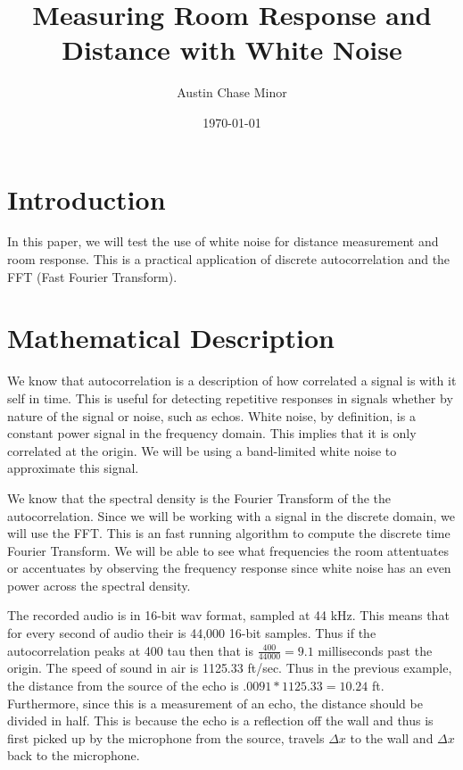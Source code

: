 \documentclass{article}
\author{Austin Chase Minor}
\title{Measuring Room Response and Distance with White Noise}
\date{\today}
\begin{document}
   \section{Introduction}
      In this paper, we will test the use of
      white noise for distance measurement and
      room response. This is a practical application
      of discrete autocorrelation and the FFT
      (Fast Fourier Transform).
   \section{Mathematical Description}
      We know that autocorrelation is a description of
      how correlated a signal is with it self in time.
      This is useful for detecting repetitive responses
      in signals whether by nature of the signal or noise,
      such as echos. White noise, by definition, is a constant
      power signal in the frequency domain. This implies that it
      is only correlated at the origin. We will be using a band-limited
      white noise to approximate this signal.

      We know that the spectral density is the Fourier Transform of the
      the autocorrelation. Since we will be working with a signal in the
      discrete domain, we will use the FFT. This is an fast running
      algorithm to compute the discrete time Fourier Transform. We will
      be able to see what frequencies the room attentuates or accentuates
      by observing the frequency response since white noise has an
      even power across the spectral density.

      The recorded audio is in 16-bit wav format, sampled at 44 kHz.
      This means that for every second of audio their is 44,000 16-bit
      samples. Thus if the autocorrelation peaks at 400 tau then
      that is $\frac{400}{44000} = 9.1$ milliseconds past the origin.
      The speed of sound in air is 1125.33 ft/sec. Thus in the previous
      example, the distance from the source
      of the echo is $.0091*1125.33 = 10.24$ ft. Furthermore, since this
      is a measurement of an echo, the distance should be divided in half.
      This is because the echo is a reflection off the wall and thus is first
      picked up by the microphone from the source, travels $\Delta x$ to the
      wall and $\Delta x$ back to the microphone.
\end{document}
